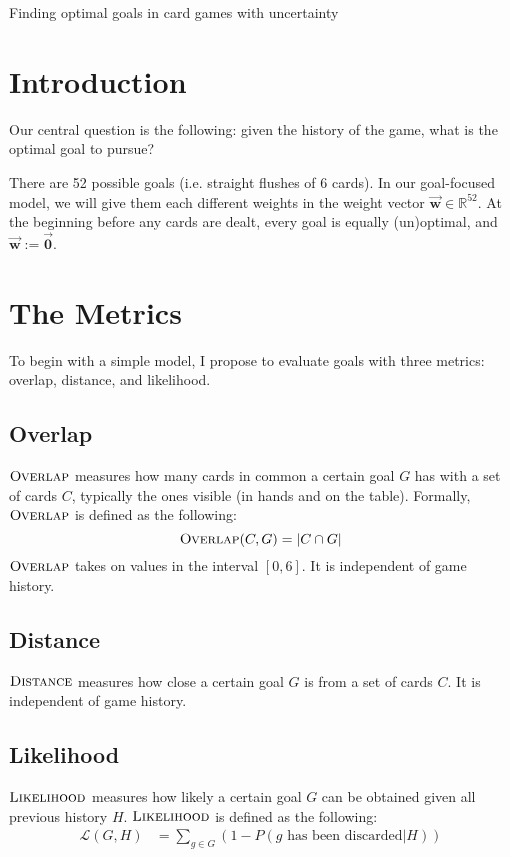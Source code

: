 \documentclass[11pt]{article}
\newcommand{\bvec}[1]{\vec{\mathbf{#1}}}
\newcommand{\R}{\mathbb{R}}
\newcommand{\dist}{\textsc{Distance}}
\newcommand{\overlap}{\textsc{Overlap}}
\newcommand{\lkhd}{\textsc{Likelihood}}
\begin{document}
\begin{center}
\Large{Finding optimal goals in card games with uncertainty}
\end{center}

\section{Introduction}

Our central question is the following: given the history of the game, what is the optimal goal to pursue?

There are 52 possible goals (i.e. straight flushes of 6 cards). In our goal-focused model, we will give them each different weights in the weight vector $\bvec{w} \in \R^{52}$. At the beginning before any cards are dealt, every goal is equally (un)optimal, and $\bvec{w} := \bvec{0}$.

\section{The Metrics}

To begin with a simple model, I propose to evaluate goals with three metrics: overlap, distance, and likelihood.

\subsection{Overlap}

$\overlap$ measures how many cards in common a certain goal $G$ has with a set of cards $C$, typically the ones visible (in hands and on the table). Formally, $\overlap$ is defined as the following:
\begin{equation}
\overlap(C,G) = |C \cap G|
\label{eq:overlap} \end{equation}
$\overlap$ takes on values in the interval $[0,6]$. It is independent of game history.

\subsection{Distance}

$\dist$ measures how close a certain goal $G$ is from a set of cards $C$. It is independent of game history.

\subsection{Likelihood}

$\lkhd$ measures how likely a certain goal $G$ can be obtained given all previous history $H$. $\lkhd$ is defined as the following:
\begin{align}
  \mathcal{L}(G,H) &= \sum_{g \in G} (1 - P(g \text{ has been discarded}|H))
\end{align}
\end{document}

